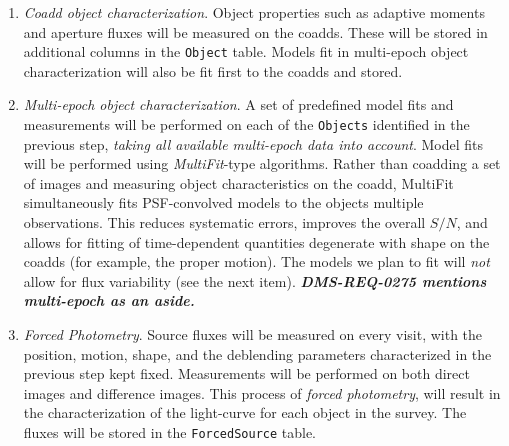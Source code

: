 \documentclass[12pt]{article}
\newcommand{\code}[1]{\texttt{#1}}
\newcommand{\annotate}[1]{{\color{magenta}\large\textbf{\emph{#1}}}}
\newcommand{\Object}{\code{Object}\xspace}
\newcommand{\Objects}{\code{Objects}\xspace}
\newcommand{\Source}{\code{Source}\xspace}
\newcommand{\Sources}{\code{Sources}\xspace}
\newcommand{\ForcedSource}{\code{ForcedSource}\xspace}
\newcommand{\req}[1]{\marginpar{\tiny #1}}
\newcommand{\dmreq}[1]{\req{DMS-REQ-#1}}
\begin{document}
\begin{enumerate}
catalogs\footnote{Note that \Sources are not considered when generating the \Object list (given the large
number of visits in each band, the false positives close to the faint end would increase the complexity of
association and deblending algorithms). It is possible for intermittent sources that are detected just above
the faint detection limit of single visits to be undetected in coaddds, and thus to not have a matching \Object.
To enable easy identification of such \Sources, the nearest \Object associated with each \Source, if any, will be recorded.}.

    The deblender will make use of all information available at this stage, including the knowledge of peak positions, bands, time, time variability (from Level 1), Galactic longitude and latitude, etc. The output of this stage is a list of uncharacterized \Objects\footnote{Depending on the exact implementation of the deblender, this stage may also attach significant metadata (eg, deblended footprints and pixel-weight maps) to each deblended \Object record.}.
    \item {\em Coadd object characterization}.  Object properties such as adaptive moments and aperture fluxes will be measured on the coadds.  These will be stored in additional columns in the \Object table.  Models fit in multi-epoch object characterization will also be fit first to the coadds and stored. \dmreq{0276}
    \item {\em Multi-epoch object characterization}. A set of predefined model fits and measurements will be performed on each of the \Objects identified in the previous step, {\it taking all available multi-epoch data into account}. Model fits will be performed using {\em MultiFit}-type algorithms. Rather than coadding a set of images and measuring object characteristics on the coadd, MultiFit simultaneously fits PSF-convolved models to the objects multiple observations. This reduces systematic errors, improves the overall $S/N$, and allows for fitting of time-dependent quantities degenerate with shape on the coadds (for example, the proper motion). The models we plan to fit will {\em not} allow for flux variability (see the next item). \dmreq{0275} \annotate{DMS-REQ-0275 mentions multi-epoch as an aside.}
    \item {\em Forced Photometry}. Source fluxes will be measured on every visit, with the position, motion, shape, and the deblending parameters characterized in the previous step kept fixed.
Measurements will be performed on both direct images and difference images.
This process of {\em forced photometry}, will result in the characterization of the light-curve for each object in the survey. The fluxes will be stored in the \ForcedSource table.\dmreq{0268}
\end{enumerate}
\end{document}
